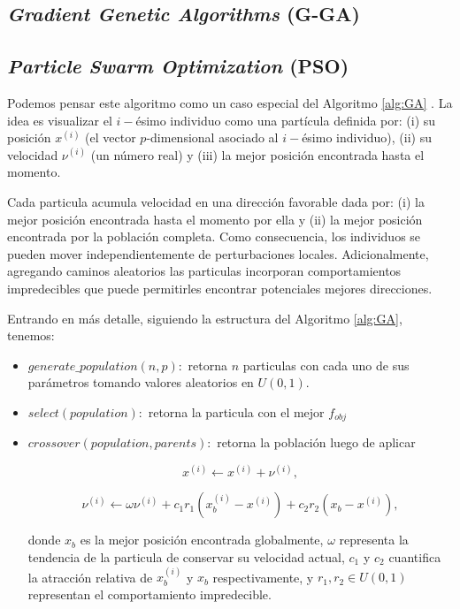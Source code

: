 \subsection{\emph{Gradient Genetic Algorithms} (G-GA)}


\subsection{\emph{Particle Swarm Optimization} (PSO)}


Podemos pensar este algoritmo como un caso especial del Algoritmo \ref{alg:GA}
\citep{Mykel2019, Prosopio-Galarza2019}.
La idea es visualizar el $i-$ésimo individuo como una partícula definida por: 
(i) su posición $x^{(i)}$ (el vector $p$-dimensional asociado al $i-$ésimo individuo),
(ii) su velocidad $\nu^{(i)}$ (un número real) y
(iii) la mejor posición encontrada hasta el momento.

Cada particula acumula velocidad en una dirección favorable dada por: 
(i) la mejor posición encontrada hasta el momento por ella y 
(ii) la mejor posición encontrada por la población completa.
Como consecuencia, los individuos se pueden mover independientemente de
perturbaciones locales.
Adicionalmente, agregando caminos aleatorios las particulas incorporan
comportamientos impredecibles que puede permitirles encontrar potenciales
mejores direcciones.

Entrando en más detalle, siguiendo la estructura del Algoritmo \ref{alg:GA}, tenemos:

\begin{itemize}

\item $generate\_population(n, p):$ retorna $n$ particulas con cada uno de
      sus parámetros tomando valores aleatorios en $U(0, 1)$.

\item $select(population):$ retorna la particula con el mejor $f_{obj}$

\item $crossover(population, parents):$ retorna la población luego de aplicar 
    
  \begin{equation}
    x^{(i)} \gets x^{(i)} + \nu^{(i)},
  \label{pso-pos}
  \end{equation}

  \begin{equation}
    \nu^{(i)} \gets \omega \nu^{(i)} + c_1 r_1 \left(x_{b}^{(i)} - x^{(i)}
    \right) + c_2 r_2 \left(x_{b} - x^{(i)} \right),
  \label{pso-speed}
  \end{equation}
    

  donde $x_{b}$  es la mejor posición encontrada globalmente, 
  $\omega$ representa la tendencia de la particula de conservar su velocidad actual,
  $c_1$ y $c_2$ cuantifica la atracción relativa de $x_{b}^{(i)}$ y $x_{b}$ respectivamente, 
  y $r_1, r_2 \in U(0, 1)$ representan el comportamiento impredecible.

\end{itemize}

